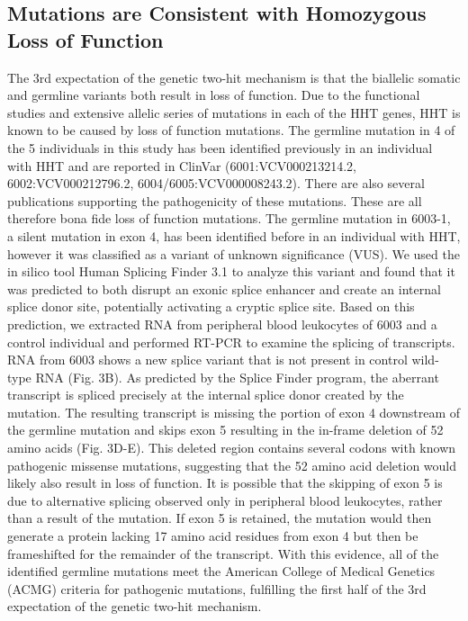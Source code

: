 \subsection{Mutations are Consistent with Homozygous Loss of Function}
The 3rd expectation of the genetic two-hit mechanism is that the biallelic somatic and germline variants both result in loss of function. Due to the functional studies and extensive allelic series of mutations in each of the HHT genes, HHT is known to be caused by loss of function mutations.   The germline mutation in 4 of the 5 individuals in this study has been identified previously in an individual with HHT and are reported in ClinVar (6001:VCV000213214.2, 6002:VCV000212796.2, 6004/6005:VCV000008243.2).   There are also several publications supporting the pathogenicity of these mutations.\citep{johnson1995, bossler2006, gallione1998, ricard2010, olivieri2007}  These are all therefore bona fide loss of function mutations.  The germline mutation in 6003-1, a silent mutation in  exon 4, has been identified before in an individual with HHT, however it was classified as a variant of unknown significance (VUS). We used the in silico tool Human Splicing Finder 3.1\citep{desmet2009} to analyze this variant and found that it was predicted to both disrupt an exonic splice enhancer and create an internal splice donor site, potentially activating a cryptic splice site. Based on this prediction, we extracted RNA from peripheral blood leukocytes of 6003 and a control individual and performed RT-PCR to examine the splicing of  transcripts. RNA from 6003 shows a new splice variant that is not present in control wild-type RNA (Fig. 3B). As predicted by the Splice Finder program, the aberrant transcript is spliced precisely at the internal splice donor created by the mutation. The resulting transcript is missing the portion of exon 4 downstream of the germline mutation and skips exon 5 resulting in the in-frame deletion of 52 amino acids (Fig. 3D-E). This deleted region contains several codons with known pathogenic missense mutations, suggesting that the 52 amino acid deletion would likely also result in loss of function. It is possible that the skipping of exon 5 is due to alternative splicing observed only in peripheral blood leukocytes, rather than a result of the mutation. If exon 5 is retained, the mutation would then generate a protein lacking 17 amino acid residues from exon 4 but then be frameshifted for the remainder of the transcript.  With this evidence, all of the identified germline mutations meet the American College of Medical Genetics (ACMG) criteria for pathogenic mutations\citep{richards2015}, fulfilling the first half of the 3rd expectation of the genetic two-hit mechanism.  

